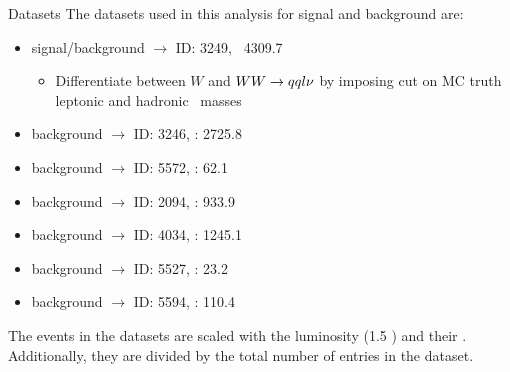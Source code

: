 \documentclass{beamer}
\begin{document}
\begin{frame}{Datasets}
The datasets used in this analysis for signal and background are:
\begin{itemize}
\item signal/background \qqln $\rightarrow$ ID: 3249, \xsec\ 4309.7~\fb
\begin{itemize}
  \item Differentiate between $W$ and $WW\rightarrow qql\nu$ by imposing cut on MC truth leptonic and hadronic \Wboson\ masses
\end{itemize}
\item background \qqll $\rightarrow$ ID: 3246, \xsec: 2725.8~\fb
\item background \qqqqll $\rightarrow$ ID: 5572, \xsec: 62.1~\fb
\item background \qqnn $\rightarrow$ ID: 2094, \xsec: 933.9~\fb
\item background \qqqq $\rightarrow$ ID: 4034, \xsec: 1245.1~\fb
\item background \qqqqnn $\rightarrow$ ID: 5527, \xsec: 23.2~\fb
\item background \qqqqln $\rightarrow$ ID: 5594, \xsec: 110.4~\fb
\end{itemize}
The events in the datasets are scaled with the luminosity (1.5 \invab) and their \xsec.
%
Additionally, they are divided by the total number of entries in the dataset.
\end{frame}
\end{document}
